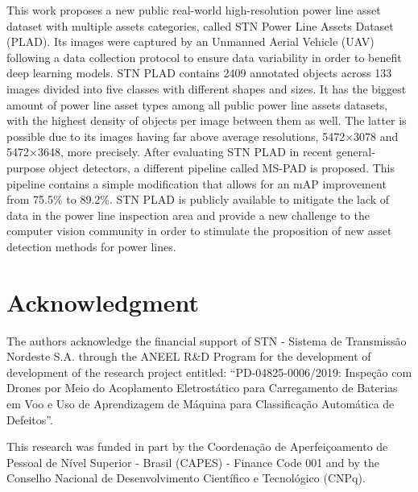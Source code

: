 \documentclass[10pt,conference]{IEEEtran}
\begin{document}
This work proposes a new public real-world high-resolution power line asset dataset with multiple assets categories, called STN Power Line Assets Dataset (PLAD). Its images were captured by an Unmanned Aerial Vehicle (UAV) following a data collection protocol to ensure data variability in order to benefit deep learning models. STN PLAD contains 2409 annotated objects across 133 images divided into five classes with different shapes and sizes. It has the biggest amount of power line asset types among all public power line assets datasets, with the highest density of objects per image between them as well. The latter is possible due to its images having far above average resolutions, 5472$\times$3078 and 5472$\times$3648, more precisely. After evaluating STN PLAD in recent general-purpose object detectors, a different pipeline called MS-PAD is proposed. This pipeline contains a simple modification that allows for an mAP improvement from 75.5\% to 89.2\%. STN PLAD is publicly available to mitigate the lack of data in the power line inspection area and provide a new challenge to the computer vision community in order to stimulate the proposition of new asset detection methods for power lines.




















\section*{Acknowledgment}
The authors acknowledge the financial support of STN - Sistema de Transmissão Nordeste S.A. through the ANEEL R\&D Program for the development of development of the research project entitled: “PD-04825-0006/2019: Inspeção com Drones por Meio do Acoplamento Eletrostático para Carregamento de Baterias em Voo e Uso de Aprendizagem de Máquina para Classificação Automática de Defeitos”. 

This research was funded in part by the Coordenação de Aperfeiçoamento de Pessoal de Nível Superior - Brasil (CAPES) - Finance Code 001 and by the Conselho Nacional de Desenvolvimento Científico e Tecnológico (CNPq).













\end{document}

